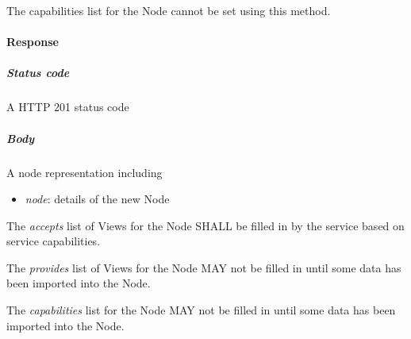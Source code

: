 \documentclass[11pt,a4paper]{ivoa}
\begin{document}
The capabilities list for the Node cannot be set using this method.

\paragraph{Response}
\subparagraph{Status code} A HTTP 201 status code
\subparagraph{Body}
A node representation including
\begin{itemize}
    \item \emph{node}: details of the new Node
\end{itemize}

The \emph{accepts} list of Views for the Node SHALL be filled in by the service based on service capabilities.

The \emph{provides} list of Views for the Node MAY not be filled in until some data has been imported into the Node.

The \emph{capabilities} list for the Node MAY not be filled in until some data has been imported into the Node.
\end{document}
